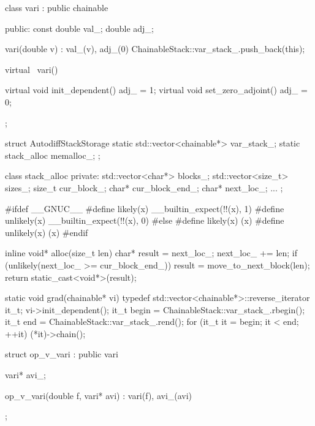 \documentclass[10pt]{report}
\begin{document}
%
\begin{stancode}
class vari : public chainable {
public:
  const double val_;
  double adj_;

  vari(double v) : val_(v), adj_(0) {
    ChainableStack::var_stack_.push_back(this);
  }

  virtual ~vari() { }

  virtual void init_dependent() { adj_ = 1; }
  virtual void set_zero_adjoint() { adj_ = 0; }
};
\end{stancode}


%
\begin{stancode}
struct AutodiffStackStorage {
  static std::vector<chainable*> var_stack_;
  static stack_alloc memalloc_;
};

class stack_alloc {
private:
  std::vector<char*> blocks_;
  std::vector<size_t> sizes_;
  size_t cur_block_;
  char* cur_block_end_;
  char* next_loc_;
  ...
};
\end{stancode}


%
\begin{stancode}
#ifdef __GNUC__
#define likely(x)      __builtin_expect(!!(x), 1)
#define unlikely(x)    __builtin_expect(!!(x), 0)
#else
#define likely(x)     (x)
#define unlikely(x)   (x)
#endif
\end{stancode}


%
\begin{stancode}
inline void* alloc(size_t len) {
  char* result = next_loc_;
  next_loc_ += len;
  if (unlikely(next_loc_ >= cur_block_end_))
    result = move_to_next_block(len);
  return static_cast<void*>(result);
}
\end{stancode}


%
\begin{stancode}
static void grad(chainable* vi) {
  typedef std::vector<chainable*>::reverse_iterator it_t;
  vi->init_dependent();
  it_t begin = ChainableStack::var_stack_.rbegin();
  it_t end = ChainableStack::var_stack_.rend();
  for (it_t it = begin; it < end; ++it)
    (*it)->chain();
}
\end{stancode}


%
\begin{stancode}
struct op_v_vari : public vari {
  vari* avi_;

  op_v_vari(double f, vari* avi) : vari(f), avi_(avi) { }
};
\end{stancode}
\end{document}
